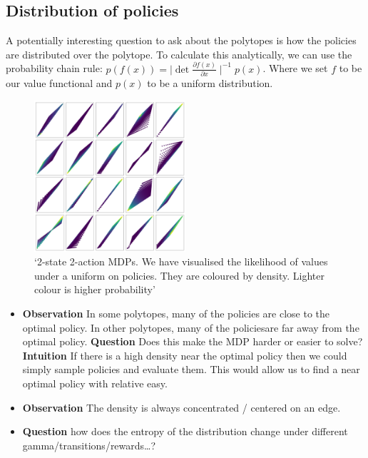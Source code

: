 \subsection{Distribution of policies}

A potentially interesting question to ask about the polytopes is how the
policies are distributed over the polytope. To calculate this
analytically, we can use the probability chain rule:
\(p(f(x)) = \mid \det\frac{\partial f(x)}{\partial x}\mid^{-1}p(x)\).
Where we set \(f\) to be our value functional and \(p(x)\) to be a
uniform distribution.

\begin{figure}
\centering
\includegraphics[width=0.5\textwidth,height=0.5\textheight]{../../pictures/figures/polytope_densities.png}
\caption{`2-state 2-action MDPs. We have visualised the likelihood of
values under a uniform on policies. They are coloured by density.
Lighter colour is higher probability'}
\end{figure}

\begin{itemize}
\item
  \textbf{Observation} In some polytopes, many of the policies are close
  to the optimal policy. In other polytopes, many of the policiesare far
  away from the optimal policy. \textbf{Question} Does this make the MDP
  harder or easier to solve? \textbf{Intuition} If there is a high
  density near the optimal policy then we could simply sample policies
  and evaluate them. This would allow us to find a near optimal policy
  with relative easy.
\item
  \textbf{Observation} The density is always concentrated / centered on
  an edge.
\item
  \textbf{Question} how does the entropy of the distribution change
  under different gamma/transitions/rewards\ldots{}?
\end{itemize}

